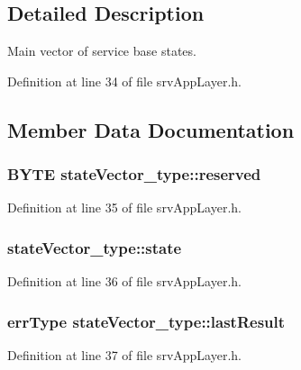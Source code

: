 \subsection{Detailed Description}
Main vector of service base states. 

Definition at line 34 of file srvAppLayer.h.



\subsection{Member Data Documentation}
\hypertarget{structstateVector__type_a92d4718b4aebde4fe96ae5fec2629849}{
\subsubsection[{reserved}]{\setlength{\rightskip}{0pt plus 5cm}BYTE {\bf stateVector\_\-type::reserved}}}
\label{d8/db4/structstateVector__type_a92d4718b4aebde4fe96ae5fec2629849}


Definition at line 35 of file srvAppLayer.h.

\hypertarget{structstateVector__type_a1e2684cb87445b9349a42be23f510eee}{
\subsubsection[{state}]{ {\bf stateVector\_\-type::state}}}
\label{d8/db4/structstateVector__type_a1e2684cb87445b9349a42be23f510eee}


Definition at line 36 of file srvAppLayer.h.

\hypertarget{structstateVector__type_a614aaf5cf7456ef97a7e0310f9f0ad17}{
\subsubsection[{lastResult}]{\setlength{\rightskip}{0pt plus 5cm}errType {\bf stateVector\_\-type::lastResult}}}
\label{d8/db4/structstateVector__type_a614aaf5cf7456ef97a7e0310f9f0ad17}


Definition at line 37 of file srvAppLayer.h.



